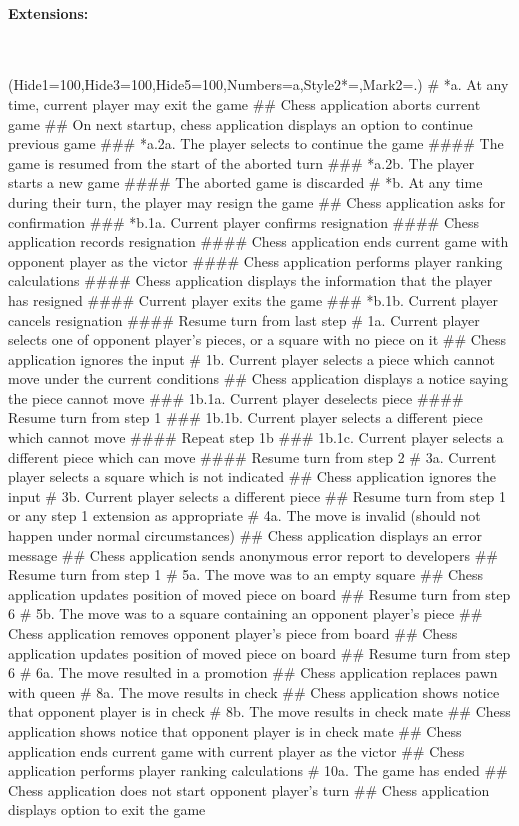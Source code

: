 \documentclass{article}
\begin{document}
\paragraph{Extensions:}\mbox{}\\
\begin{easylist}[enumerate]
\ListProperties(Hide1=100,Hide3=100,Hide5=100,Numbers=a,Style2*=,Mark2=.)
# *a. At any time, current player may exit the game
## Chess application aborts current game
## On next startup, chess application displays an option to continue previous game
### *a.2a. The player selects to continue the game
#### The game is resumed from the start of the aborted turn
### *a.2b. The player starts a new game
#### The aborted game is discarded
# *b. At any time during their turn, the player may resign the game
## Chess application asks for confirmation
### *b.1a. Current player confirms resignation
#### Chess application records resignation
#### Chess application ends current game with opponent player as the victor
#### Chess application performs player ranking calculations
#### Chess application displays the information that the player has resigned
#### Current player exits the game
### *b.1b. Current player cancels resignation
#### Resume turn from last step
# 1a. Current player selects one of opponent player's pieces, or a square with no piece on it
## Chess application ignores the input
# 1b. Current player selects a piece which cannot move under the current conditions
## Chess application displays a notice saying the piece cannot move
### 1b.1a. Current player deselects piece
#### Resume turn from step 1
### 1b.1b. Current player selects a different piece which cannot move
#### Repeat step 1b
### 1b.1c. Current player selects a different piece which can move
#### Resume turn from step 2
# 3a. Current player selects a square which is not indicated
## Chess application ignores the input
# 3b. Current player selects a different piece
## Resume turn from step 1 or any step 1 extension as appropriate
# 4a. The move is invalid (should not happen under normal circumstances)
## Chess application displays an error message
## Chess application sends anonymous error report to developers
## Resume turn from step 1
# 5a. The move was to an empty square
## Chess application updates position of moved piece on board
## Resume turn from step 6
# 5b. The move was to a square containing an opponent player's piece
## Chess application removes opponent player's piece from board
## Chess application updates position of moved piece on board
## Resume turn from step 6
# 6a. The move resulted in a promotion
## Chess application replaces pawn with queen
# 8a. The move results in check
## Chess application shows notice that opponent player is in check
# 8b. The move results in check mate
## Chess application shows notice that opponent player is in check mate
## Chess application ends current game with current player as the victor
## Chess application performs player ranking calculations
# 10a. The game has ended
## Chess application does not start opponent player's turn
## Chess application displays option to exit the game
\end{easylist}
\end{document}
